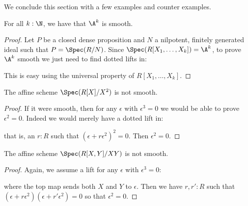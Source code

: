 We conclude this section with a few examples and counter examples.

\begin{lemma}\label{An-is-smooth}
For all $k:\N$, we have that $\A^k$ is smooth.
\end{lemma}

\begin{proof}
  Let $P$ be a closed dense proposition and $N$ a nilpotent, finitely generated ideal such that $P=\Spec(R/N)$.
  Since $\Spec(R[X_1,\dots,X_k])=\A^k$, to prove $\A^k$ smooth we just need to find dotted lifts in:
  \begin{center}
  \end{center}
  This is easy using the universal property of $R[X_1,\dots,X_k]$.
\end{proof}

\begin{example}
The affine scheme $\Spec(R[X]/X^2)$ is not smooth.
\end{example}

\begin{proof}
If it were smooth, then for any $\epsilon$ with $\epsilon^3=0$ we would be able to prove $\epsilon^2=0$.
Indeed we would merely have a dotted lift in:
 \begin{center}
    \end{center}
    that is, an $r:R$ such that $(\epsilon+r\epsilon^2)^2=0$. Then $\epsilon^2=0$.
\end{proof}

\begin{example}
The affine scheme $\Spec(R[X,Y]/XY)$ is not smooth.
\end{example}

\begin{proof}
Again, we assume a lift for any $\epsilon$ with $\epsilon^3=0$:
 \begin{center}
 \end{center}
 where the top map sends both $X$ and $Y$ to $\epsilon$. Then we have $r,r':R$ such that $(\epsilon+r\epsilon^2)(\epsilon+r'\epsilon^2)=0$ so that $\epsilon^2=0$.
\end{proof}

